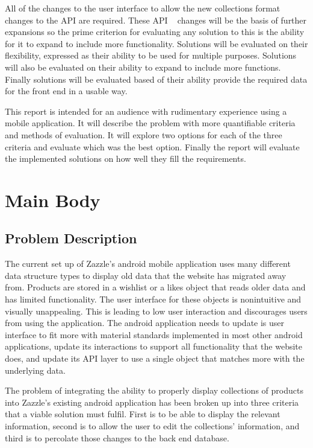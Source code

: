 \documentclass[12pt]{article}
\begin{document}
All of the changes to the user interface to allow the new collections format changes to the API are required. These API ~\cite{api} changes will be the basis of further expansions so the prime criterion for evaluating any solution to this is the ability for it to expand to include more functionality. Solutions will be evaluated on their flexibility, expressed as their ability to be used for multiple purposes. Solutions will also be evaluated on their ability to expand to include more functions. Finally solutions will be evaluated based of their ability provide the required data for the front end in a usable way.

This report is intended for an audience with rudimentary experience using a mobile application. It will describe the problem with more quantifiable criteria and methods of evaluation. It will explore two options for each of the three criteria and evaluate which was the best option. Finally the report will evaluate the implemented solutions on how well they fill the requirements.

\section{Main Body}
\subsection{Problem Description} %
\label{sub:problem_description}
The current set up of Zazzle's android mobile application uses many different data structure types to display old data that the website has migrated away from. Products are stored in a wishlist or a likes object that reads older data and has limited functionality. The user interface for these objects is nonintuitive and visually unappealing. This is leading to low user interaction and discourages users from using the application. The android application needs to update is user interface to fit more with material standards implemented in most other android applications, update its interactions to support all functionality that the website does, and update its API layer to use a single object that matches more with the underlying data.

The problem of integrating the ability to properly display collections of products into Zazzle's existing android application has been broken up into three criteria that a viable solution must fulfil. First is to be able to display the relevant information, second is to allow the user to edit the collections' information, and third is to percolate those changes to the back end database. 
\end{document}
